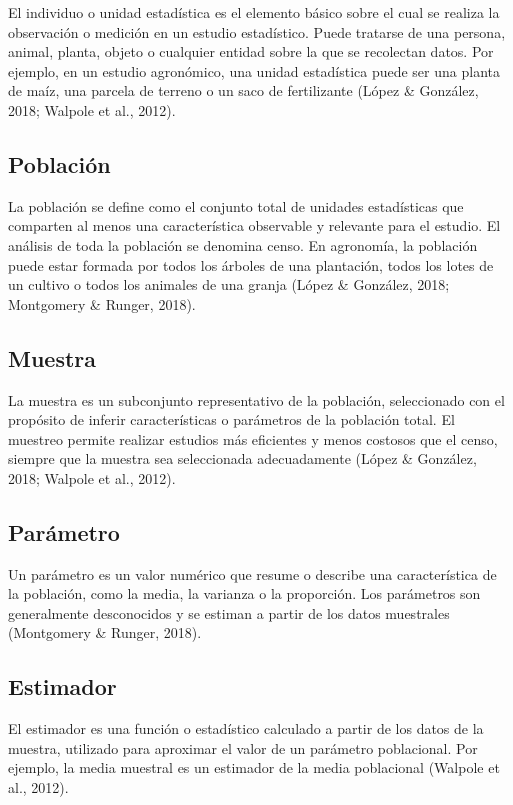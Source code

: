 \documentclass[
  spanish,
  letterpaper,
]{book}
\begin{document}
El individuo o unidad estadística es el elemento básico sobre el cual se
realiza la observación o medición en un estudio estadístico. Puede
tratarse de una persona, animal, planta, objeto o cualquier entidad
sobre la que se recolectan datos. Por ejemplo, en un estudio agronómico,
una unidad estadística puede ser una planta de maíz, una parcela de
terreno o un saco de fertilizante (López \& González, 2018; Walpole et
al., 2012).

\subsection{Población}\label{poblaciuxf3n}

La población se define como el conjunto total de unidades estadísticas
que comparten al menos una característica observable y relevante para el
estudio. El análisis de toda la población se denomina censo. En
agronomía, la población puede estar formada por todos los árboles de una
plantación, todos los lotes de un cultivo o todos los animales de una
granja (López \& González, 2018; Montgomery \& Runger, 2018).

\subsection{Muestra}\label{muestra}

La muestra es un subconjunto representativo de la población,
seleccionado con el propósito de inferir características o parámetros de
la población total. El muestreo permite realizar estudios más eficientes
y menos costosos que el censo, siempre que la muestra sea seleccionada
adecuadamente (López \& González, 2018; Walpole et al., 2012).

\subsection{Parámetro}\label{paruxe1metro}

Un parámetro es un valor numérico que resume o describe una
característica de la población, como la media, la varianza o la
proporción. Los parámetros son generalmente desconocidos y se estiman a
partir de los datos muestrales (Montgomery \& Runger, 2018).

\subsection{Estimador}\label{estimador}

El estimador es una función o estadístico calculado a partir de los
datos de la muestra, utilizado para aproximar el valor de un parámetro
poblacional. Por ejemplo, la media muestral es un estimador de la media
poblacional (Walpole et al., 2012).
\end{document}
